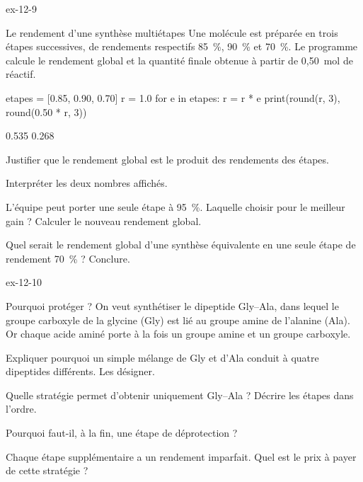 \begin{blocLivre}{ex-12-9}
\begin{exercice}[2]{Le rendement d'une synthèse multiétapes}
Une molécule est préparée en trois étapes successives, de rendements respectifs 85~\%, 90~\% et 70~\%. Le programme
calcule le rendement global et la quantité finale obtenue à partir de 0,50~mol de réactif.
\begin{python}
etapes = [0.85, 0.90, 0.70]
r = 1.0
for e in etapes:
    r = r * e
print(round(r, 3), round(0.50 * r, 3))
\end{python}
\begin{console}
0.535 0.268
\end{console}
\begin{questions}
\item {}Justifier que le rendement global est le produit des rendements des étapes.
\item Interpréter les deux nombres affichés.
\item L'équipe peut porter une seule étape à 95~\%. Laquelle choisir pour le meilleur gain ? Calculer le nouveau
rendement global.
\item Quel serait le rendement global d'une synthèse équivalente en une seule étape de rendement 70~\% ? Conclure.
\end{questions}
\end{exercice}
\end{blocLivre}
\begin{blocLivre}{ex-12-10}
\begin{exercice}[2]{Pourquoi protéger ?}
On veut synthétiser le dipeptide Gly--Ala, dans lequel le groupe carboxyle de la glycine (Gly) est lié au groupe amine
de l'alanine (Ala). Or chaque acide aminé porte à la fois un groupe amine et un groupe carboxyle.
\begin{questions}
\item Expliquer pourquoi un simple mélange de Gly et d'Ala conduit à quatre dipeptides différents. Les désigner.
\item Quelle stratégie permet d'obtenir uniquement Gly--Ala ? Décrire les étapes dans l'ordre.
\item Pourquoi faut-il, à la fin, une étape de déprotection ?
\item Chaque étape supplémentaire a un rendement imparfait. Quel est le prix à payer de cette stratégie ?
\end{questions}
\end{exercice}
\end{blocLivre}
